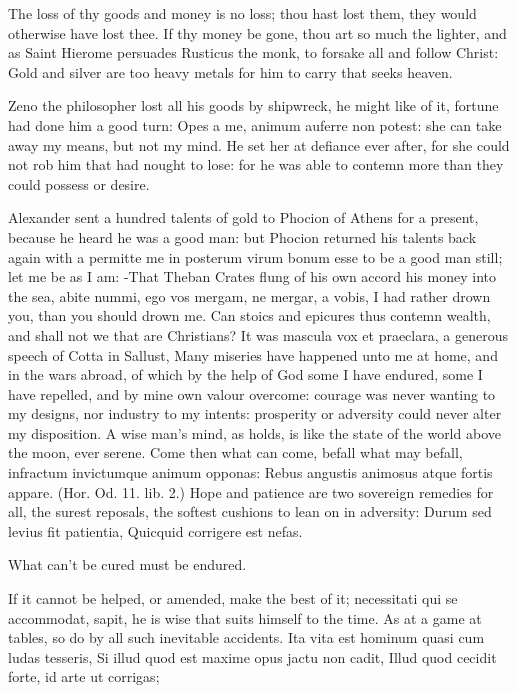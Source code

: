 {The loss of thy goods and money is no loss;  thou hast lost them,
they would otherwise have lost thee. If thy money be gone, thou
art so much the lighter, and as Saint Hierome persuades Rusticus the
monk, to forsake all and follow Christ: Gold and silver are too heavy
metals for him to carry that seeks heaven.

Zeno the philosopher lost all his goods by shipwreck, he might
like of it, fortune had done him a good turn: Opes a me, animum auferre
non potest: she can take away my means, but not my mind. He set her at
defiance ever after, for she could not rob him that had nought to lose:
for he was able to contemn more than they could possess or desire.

Alexander sent a hundred talents of gold to Phocion of Athens for a
present, because he heard he was a good man: but Phocion returned his
talents back again with a permitte me in posterum virum bonum esse to
be a good man still; let me be as I am: -That Theban Crates flung of his own accord his money into
the sea, abite nummi, ego vos mergam, ne mergar, a vobis, I had rather
drown you, than you should drown me. Can stoics and epicures thus
contemn wealth, and shall not we that are Christians? It was mascula
vox et praeclara, a generous speech of Cotta in Sallust, Many
miseries have happened unto me at home, and in the wars abroad, of
which by the help of God some I have endured, some I have repelled, and
by mine own valour overcome: courage was never wanting to my designs,
nor industry to my intents: prosperity or adversity could never alter
my disposition. A wise man's mind, as \Seneca holds,  is like the
state of the world above the moon, ever serene. Come then what can
come, befall what may befall, infractum invictumque  animum
opponas: Rebus angustis animosus atque fortis appare. (Hor. Od. 11.
lib. 2.) Hope and patience are two sovereign remedies for all, the
surest reposals, the softest cushions to lean on in adversity:
Durum sed levius fit patientia,
Quicquid corrigere est nefas.

What can't be cured must be endured.

If it cannot be helped, or amended, make the best of it; 
necessitati qui se accommodat, sapit, he is wise that suits himself to
the time. As at a game at tables, so do by all such inevitable
accidents.
Ita vita est hominum quasi cum ludas tesseris,
Si illud quod est maxime opus jactu non cadit,
Illud quod cecidit forte, id arte ut corrigas;

}

